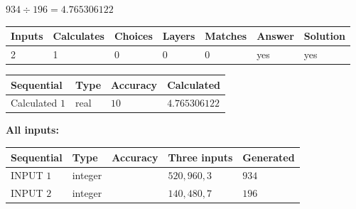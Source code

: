 \documentclass{ctexart}
\begin{document}
 

$ %
934 \div  %
196=   %
4.765306122$
 
 
\noindent{}
 
 

 
   
   
   
   
\noindent\begin{tabular}{|l|l|l|l|l|l|l|}
 \hline
Inputs & Calculates & Choices & Layers & Matches & Answer & Solution \\ \hline
 2  & 
 1  & 
 0
  & 
 0  & 
 0  & 
  yes & 
  yes 
  \\ \hline
 \end{tabular}
   
   
   
   
\noindent{}
   
   
  
  
\noindent\begin{tabular}{|l|l|l|l|}
\hline
 Sequential & Type & Accuracy & Calculated \\ 
\hline
 
 
  Calculated $  1 $ & real & $  10  $ & 
 $ 4.765306122 $ 
 \\  \hline  
 \end{tabular}
   
   
   
   
\noindent\vspace{0.1in}\hspace{-0.08in} {\textbf{\Large{All inputs: }}}
   
   
  
  
\noindent\begin{tabular}{|l|l|l|l|l|}
\hline
 Sequential & Type & Accuracy & Three inputs & Generated \\ 
\hline
 
 
  INPUT $  1 $ & integer &  & $
 520
 , 
 960
 , 
 3
 $ & $ 934 $ 
 \\  \hline  
 
 
  INPUT $  2 $ & integer &  & $
 140
 , 
 480
 , 
 7
 $ & $ 196 $ 
 \\  \hline  
 \end{tabular}
   
   
  
\vspace{0.2in}
  
\end{document}

